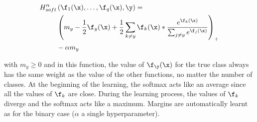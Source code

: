 \begin{align}\label{eq:Hingesoft}
\begin{split}
 H^{\alpha}_{soft}&\left(\f_1(\x),\ldots, \f_q(\x),\y \right) 	=\\
 &\left(m_y-\frac{1}{2} \f_y(\x)+\frac{1}{2} \sum_{k\neq y} \f_k(\x)*\frac{e^{\f_k(\x)}}{\sum_{j\neq y} e^{\f_j(\x)}}\right)_+\\
 & - \alpha  m_y
	\end{split}
\end{align}


with $m_y\geq 0$ and 
 in this function, the value of $\f_{\y}(\x)$ for the true class  always has the same weight as the value of the other functions, no matter the number of classes. At the beginning of the learning, the softmax acts like an average since all the values of $\f_k$ are close. During the learning process, the values of $\f_k$ diverge and the softmax acts like a maximum.  Margins are automatically learnt as for the binary case ($\alpha$ a single hyperparameter).